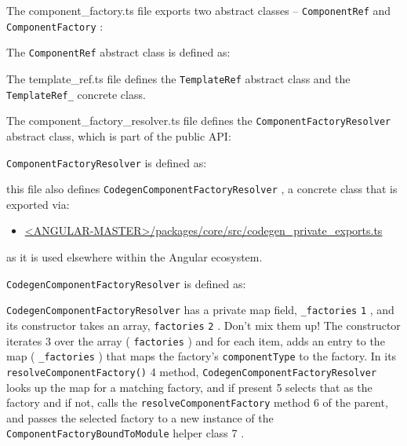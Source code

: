 The component\_factory.ts file exports two abstract classes –
\texttt{ComponentRef}
and
\texttt{ComponentFactory}
:



The
\texttt{ComponentRef}
abstract class is defined as:



The template\_ref.ts file defines the
\texttt{TemplateRef}
abstract  class and the
\texttt{TemplateRef\_}
concrete class.



The component\_factory\_resolver.ts file defines the
\texttt{ComponentFactoryResolver}
abstract class, which is part of the public API:

\texttt{ComponentFactoryResolver}
is defined as:



this file also defines
\texttt{CodegenComponentFactoryResolver}
, a concrete class that is
exported via:

\begin{itemize}
  \item \href{https://github.com/angular/angular/blob/master/packages/core/src/codegen_private_exports.ts}
        {<ANGULAR-MASTER>/packages/core/src/codegen\_private\_exports.ts}
\end{itemize}

as it is used elsewhere within the Angular ecosystem.

\texttt{CodegenComponentFactoryResolver}
is defined as:



\texttt{CodegenComponentFactoryResolver}
has a private map field,
\texttt{\_factories}
\texttt{1}
, and its
constructor takes an array,
\texttt{factories}
\texttt{2}
. Don’t mix them up! The constructor iterates
3
over the array (
\texttt{factories}
) and for each item, adds an entry to the map
(
\texttt{\_factories}
) that maps the factory’s
\texttt{componentType}
to the factory. In its
\texttt{resolveComponentFactory()}
4
method,
\texttt{CodegenComponentFactoryResolver}
looks
up the map for a matching factory, and if present
5
selects that as the factory and if
not, calls the
\texttt{resolveComponentFactory}
method
6
of the parent, and passes the
selected factory to a new instance of the
\texttt{ComponentFactoryBoundToModule}
helper
class
7
.

